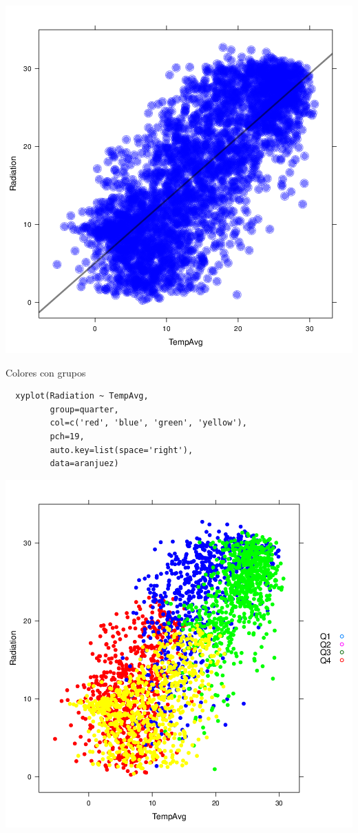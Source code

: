 \documentclass[xcolor={usenames,svgnames,dvipsnames}]{beamer}
\begin{document}
\begin{frame}[label={sec:orgheadline26}]{}
\includegraphics[width=.9\linewidth]{figs/xyplotColors.png}
\end{frame}

\begin{frame}[fragile,label={sec:orgheadline27}]{Colores con grupos}
 \lstset{language=R,label= ,caption= ,captionpos=b,numbers=none}
\begin{lstlisting}
  xyplot(Radiation ~ TempAvg,
         group=quarter,
         col=c('red', 'blue', 'green', 'yellow'),
         pch=19,
         auto.key=list(space='right'),
         data=aranjuez)
\end{lstlisting}
\end{frame}

\begin{frame}[label={sec:orgheadline28}]{}
\includegraphics[width=.9\linewidth]{figs/xyplotColorGroups.png}
\end{frame}
\end{document}
